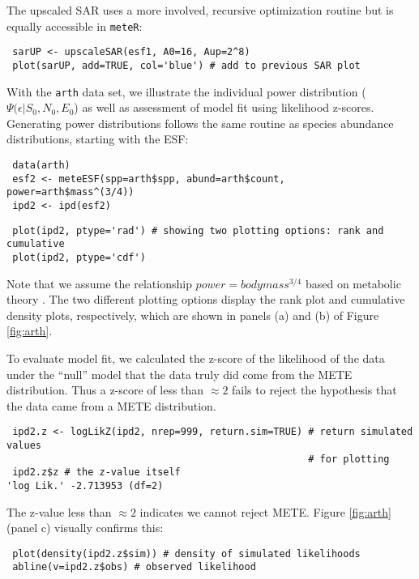 The upscaled SAR uses a more involved, recursive optimization routine
\citep[see eqns (7.70) and (7.71) in][]{Harte:2011ut} but is equally
accessible in \texttt{meteR}:

\begin{verbatim}
 sarUP <- upscaleSAR(esf1, A0=16, Aup=2^8)
 plot(sarUP, add=TRUE, col='blue') # add to previous SAR plot
\end{verbatim}


With the \texttt{arth} data set, we illustrate the individual power
distribution ($\Psi(\epsilon | S_0, N_0, E_0$) as well as assessment
of model fit using likelihood z-scores. Generating power distributions
follows the same routine as species abundance distributions, starting
with the ESF:

\begin{verbatim}
 data(arth)
 esf2 <- meteESF(spp=arth$spp, abund=arth$count, power=arth$mass^(3/4))
 ipd2 <- ipd(esf2)
\end{verbatim}

\begin{verbatim}
 plot(ipd2, ptype='rad') # showing two plotting options: rank and cumulative
 plot(ipd2, ptype='cdf')
\end{verbatim}

Note that we assume the relationship $power=body mass^{3/4}$ based on
metabolic theory \citep{brown2004metab}. The two different plotting
options display the rank plot and cumulative density plots,
respectively, which are shown in panels (a) and (b) of Figure
\ref{fig:arth}.

To evaluate model fit, we calculated the z-score of the likelihood of
the data under the ``null'' model that the data truly did come from
the METE distribution. Thus a z-score of less than $\approx 2$ fails
to reject the hypothesis that the data came from a METE distribution.
\begin{verbatim}
 ipd2.z <- logLikZ(ipd2, nrep=999, return.sim=TRUE) # return simulated values 
                                                    # for plotting
 ipd2.z$z # the z-value itself
'log Lik.' -2.713953 (df=2)
\end{verbatim}
The z-value less than $\approx 2$ indicates we cannot reject METE.
Figure \ref{fig:arth} (panel c) visually confirms this:
\begin{verbatim}
 plot(density(ipd2.z$sim)) # density of simulated likelihoods
 abline(v=ipd2.z$obs) # observed likelihood
\end{verbatim}


